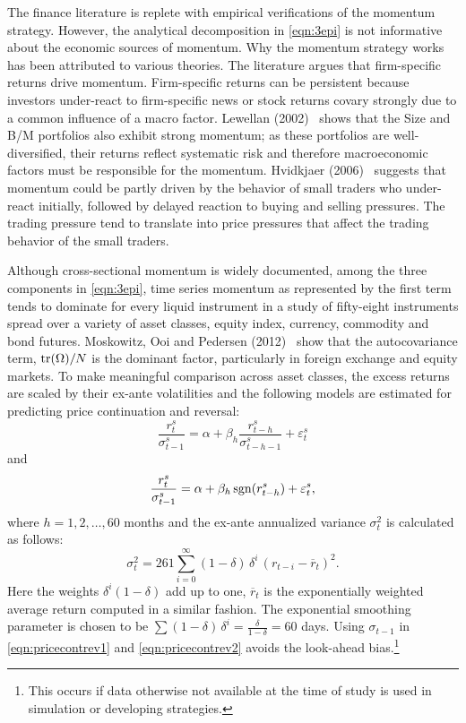 The finance literature is replete with empirical verifications of the momentum strategy. However, the analytical decomposition in \eqref{eqn:3epi} is not informative about the economic sources of momentum. Why the momentum strategy works has been attributed to various theories. The literature argues that firm-specific returns drive momentum. Firm-specific returns can be persistent because investors under-react to firm-specific news or stock returns covary strongly due to a common influence of a macro factor. Lewellan (2002)~\cite{lew2002} shows that the Size and B/M portfolios also exhibit strong momentum; as these portfolios are well-diversified, their returns reflect systematic risk and therefore macroeconomic factors must be responsible for the momentum. Hvidkjaer (2006)~\cite{hvid2006} suggests that momentum could be partly driven by the behavior of small traders who under-react initially, followed by delayed reaction to buying and selling pressures. The trading pressure tend to translate into price pressures that affect the trading behavior of the small traders.


Although cross-sectional momentum is widely documented, among the three components in \eqref{eqn:3epi}, time series momentum as represented by the first term tends to dominate for every liquid instrument in a study of fifty-eight instruments spread over a variety of asset classes, equity index, currency, commodity and bond futures. Moskowitz, Ooi and Pedersen (2012)~\cite{mos2012} show that the autocovariance term, $\operatorname{tr}(\Omega)/N$ is the dominant factor, particularly in foreign exchange and equity markets. To make meaningful comparison across asset classes, the excess returns are scaled by their ex-ante volatilities and the following models are estimated for predicting price continuation and reversal:
	\begin{equation} \label{eqn:pricecontrev1}
	\frac{r_t^s}{\sigma_{t-1}^s} = \alpha + \beta_h \dfrac{r_{t-h}^s}{\sigma_{t-h-1}^s} + \varepsilon_t^s
	\end{equation}
and
	\begin{equation} \label{eqn:pricecontrev2}
	\frac{r_t^s}{\sigma_{t-1}^s} = \alpha + \beta_h \sgn(r_{t-h}^s) + \varepsilon_t^s,
	\end{equation}
where $h= 1,2, \ldots, 60$ months and the ex-ante annualized variance $\sigma_t^2$ is calculated as follows:
	\begin{equation}\label{eqn:pricecontrev3}
	\sigma_t^2 = 261 \sum_{i=0}^\infty (1 - \delta)\,\delta^i \,(r_{t-i} - \overline{r}_t)^2.
	\end{equation}
Here the weights $\delta^i (1 - \delta)$ add up to one, $\overline{r}_t$ is the exponentially weighted average return computed in a similar fashion. The exponential smoothing parameter is chosen to be $\sum(1 - \delta)\, \delta^i = \frac{\delta}{1 - \delta} = 60$ days. Using $\sigma_{t-1}$ in \eqref{eqn:pricecontrev1} and \eqref{eqn:pricecontrev2} avoids the look-ahead bias.\footnote{This occurs if data otherwise not available at the time of study is used in simulation or developing strategies.}


